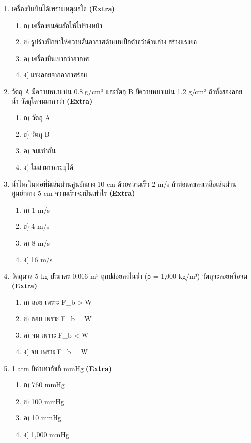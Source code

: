 \documentclass[12pt]{article}
\begin{document}
\begin{enumerate}[label=\arabic*.]
\item เครื่องบินบินได้เพราะเหตุผลใด \hfill \textbf{\small (Extra)}
\begin{enumerate}[label=)]
\item ก) เครื่องยนต์ผลักให้ไปข้างหน้า
\item ข) รูปร่างปีกทำให้ความดันอากาศด้านบนปีกต่ำกว่าด้านล่าง สร้างแรงยก
\item ค) เครื่องบินเบากว่าอากาศ
\item ง) แรงลอยจากอากาศร้อน
\end{enumerate}
\item วัตถุ A มีความหนาแน่น 0.8 g/cm³ และวัตถุ B มีความหนาแน่น 1.2 g/cm³ ถ้าทั้งสองลอยน้ำ วัตถุใดจมมากกว่า \hfill \textbf{\small (Extra)}
\begin{enumerate}[label=)]
\item ก) วัตถุ A
\item ข) วัตถุ B
\item ค) จมเท่ากัน
\item ง) ไม่สามารถระบุได้
\end{enumerate}
\item น้ำไหลในท่อที่มีเส้นผ่านศูนย์กลาง 10 cm ด้วยความเร็ว 2 m/s ถ้าท่อแคบลงเหลือเส้นผ่านศูนย์กลาง 5 cm ความเร็วจะเป็นเท่าไร \hfill \textbf{\small (Extra)}
\begin{enumerate}[label=)]
\item ก) 1 m/s
\item ข) 4 m/s
\item ค) 8 m/s
\item ง) 16 m/s
\end{enumerate}
\item วัตถุมวล 5 kg ปริมาตร 0.006 m³ ถูกปล่อยลงในน้ำ (ρ = 1,000 kg/m³) วัตถุจะลอยหรือจม \hfill \textbf{\small (Extra)}
\begin{enumerate}[label=)]
\item ก) ลอย เพราะ F\_b > W
\item ข) ลอย เพราะ F\_b = W
\item ค) จม เพราะ F\_b < W
\item ง) จม เพราะ F\_b = W
\end{enumerate}
\item 1 atm มีค่าเท่ากับกี่ mmHg \hfill \textbf{\small (Extra)}
\begin{enumerate}[label=)]
\item ก) 760 mmHg
\item ข) 100 mmHg
\item ค) 10 mmHg
\item ง) 1,000 mmHg
\end{enumerate}

\end{enumerate}
\end{document}
